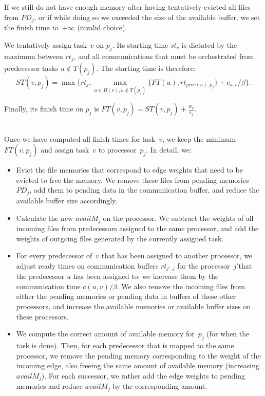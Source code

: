 \documentclass[conference]{IEEEtran}
\newcommand{\PD}{PD}
\begin{document}
    If we still do not have enough memory after having tentatively evicted all files from $\PD_j$,
    or if while doing so we exceeded the size of the available buffer,
    we set the finish time to~$+\infty$ (invalid choice).

    \smallskip
     We tentatively assign task~$v$ on $p_j$.
    Its starting time $st_v$ is dictated by the maximum between $rt_j$, and all communications that
    must be orchestrated from predecessor tasks $u\notin T(p_j)$.
    The starting time is therefore:\\[-.7cm]
    
   {\footnotesize{ \[ST(v, p_j) = \max{ \{rt_j, \max_{ u \in \Pi(v), u\notin T(p_j)}\{ FT(u) , rt_{proc(u), p_j}\} + c_{u,v} / \beta \} .} \]}}
   
  \noindent  Finally, its finish time on $p_j$ is 
    $FT(v,p_j) = ST(v, p_j) + \frac{w_v}{s_j}$.



    \medskip
    \\
    Once we have computed all finish times for task~$v$,
    we keep the minimum $FT(v,p_j)$ and assign task~$v$
    to processor~$p_j$.
    In detail, we:
    \begin{itemize}
        \item  Evict the file memories that correspond to edge weights that need to be evicted to free the memory.
        We remove these files from pending memories
        $PD_j$, add them to pending data in the communication buffer, and reduce the available buffer size accordingly.
        \item    Calculate the new $availM_j$ on the processor.
        We subtract the weights of all incoming files from predecessors assigned to the same processor,
        and add the weights of outgoing files generated by the currently assigned task.
        \item  For every predecessor of~$v$ that has been assigned to another processor, we adjust ready times on
        communication buffers $rt_{j', j}$ for the processor~$j'$that the predecessor $u$ has been assigned to: we increase them by the
        communication time $c( u,v) / \beta$.
        We also remove the incoming files from either the pending memories or pending data in buffers of these other
        processors, and increase the available memories or available buffer sizes on these processors.
        \item We compute the correct amount of available memory for~$p_j$ (for when the task is done).
        Then, for each predecessor that is mapped to the same processor, 
        we remove the pending memory corresponding to the weight of
        the incoming edge, also freeing the same amount of available memory (increasing $availM_j$).
        For each successor, we rather add the edge weights to pending memories and reduce $availM_j$ 
        by the corresponding amount.
    \end{itemize}
\end{document}
